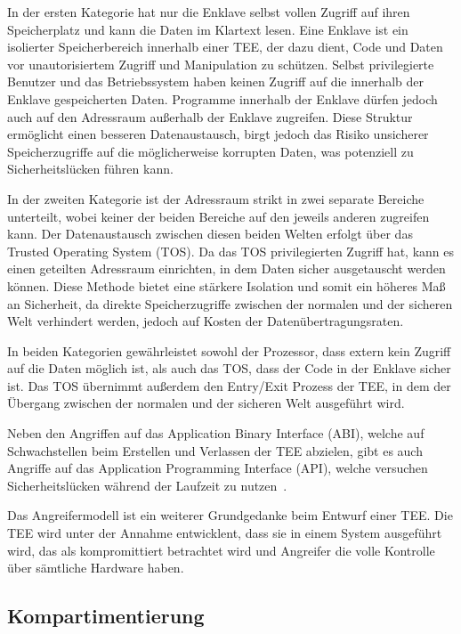 In der ersten Kategorie hat nur die Enklave selbst vollen Zugriff auf ihren Speicherplatz und kann die Daten im Klartext lesen. 
Eine Enklave ist ein isolierter Speicherbereich innerhalb einer TEE, der dazu dient, Code und Daten vor unautorisiertem Zugriff und Manipulation zu schützen.
Selbst privilegierte Benutzer und das Betriebssystem haben keinen Zugriff auf die innerhalb der Enklave gespeicherten Daten. 
Programme innerhalb der Enklave dürfen jedoch auch auf den Adressraum außerhalb der Enklave zugreifen. 
Diese Struktur ermöglicht einen besseren Datenaustausch, birgt jedoch das Risiko unsicherer Speicherzugriffe auf die möglicherweise korrupten Daten, was potenziell zu Sicherheitslücken führen kann.

In der zweiten Kategorie ist der Adressraum strikt in zwei separate Bereiche unterteilt, wobei keiner der beiden Bereiche auf den jeweils anderen zugreifen kann. 
Der Datenaustausch zwischen diesen beiden Welten erfolgt über das Trusted Operating System (TOS). 
Da das TOS privilegierten Zugriff hat, kann es einen geteilten Adressraum einrichten, in dem Daten sicher ausgetauscht werden können. 
Diese Methode bietet eine stärkere Isolation und somit ein höheres Maß an Sicherheit, da direkte Speicherzugriffe zwischen der normalen und der sicheren Welt verhindert werden, jedoch auf Kosten der Datenübertragungsraten.

In beiden Kategorien gewährleistet sowohl der Prozessor, dass extern kein Zugriff auf die Daten möglich ist, als auch das TOS, dass der Code in der Enklave sicher ist. Das TOS übernimmt außerdem den Entry/Exit Prozess der TEE, in dem der Übergang zwischen der normalen und der sicheren Welt ausgeführt wird. 

Neben den Angriffen auf das Application Binary Interface (ABI), welche auf Schwachstellen beim Erstellen und Verlassen der TEE abzielen, gibt es auch Angriffe auf das Application Programming Interface (API), welche versuchen Sicherheitslücken während der Laufzeit zu nutzen~\cite{TEEPaper}.

Das Angreifermodell ist ein weiterer Grundgedanke beim Entwurf einer TEE. Die TEE wird unter der Annahme entwicklent, dass sie in einem System ausgeführt wird, das als kompromittiert betrachtet wird und Angreifer die volle Kontrolle über sämtliche Hardware haben.


\subsection{Kompartimentierung}


